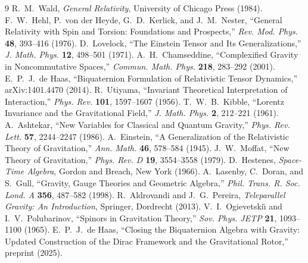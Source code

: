 \documentclass[12pt,a4paper]{article}
\theoremstyle{remark}\newtheorem{remark}[definition]{Remark}
\begin{document}
\begin{thebibliography}{9}
 R.~M.~Wald, \emph{General Relativity}, University of Chicago Press (1984).
 F.~W.~Hehl, P.~von der Heyde, G.~D.~Kerlick, and J.~M.~Nester,
``General Relativity with Spin and Torsion: Foundations and Prospects,''
\emph{Rev. Mod. Phys.} \textbf{48}, 393--416 (1976).
 D.~Lovelock, ``The Einstein Tensor and Its Generalizations,''
\emph{J. Math. Phys.} \textbf{12}, 498--501 (1971).
 A.~H.~Chamseddine, ``Complexified Gravity in
Noncommutative Spaces,'' \emph{Commun. Math. Phys.} \textbf{218}, 283--292 (2001).
 E.~P.~J.~de Haas, ``Biquaternion Formulation of
Relativistic Tensor Dynamics,'' arXiv:1401.4470 (2014).
 R.~Utiyama, ``Invariant Theoretical Interpretation of
Interaction,'' \emph{Phys. Rev.} \textbf{101}, 1597--1607 (1956).
 T.~W.~B.~Kibble, ``Lorentz Invariance and the
Gravitational Field,'' \emph{J. Math. Phys.} \textbf{2}, 212--221 (1961).
 A.~Ashtekar, ``New Variables for Classical and
Quantum Gravity,'' \emph{Phys. Rev. Lett.} \textbf{57}, 2244--2247 (1986).
 A.~Einstein, ``A Generalization of the Relativistic
Theory of Gravitation,'' \emph{Ann. Math.} \textbf{46}, 578--584 (1945).
 J.~W.~Moffat, ``New Theory of Gravitation,''
\emph{Phys. Rev. D} \textbf{19}, 3554--3558 (1979).
 D.~Hestenes, \emph{Space-Time Algebra}, Gordon and
Breach, New York (1966).
 A.~Lasenby, C.~Doran, and S.~Gull, ``Gravity, Gauge
Theories and Geometric Algebra,'' \emph{Phil. Trans. R. Soc. Lond. A}
\textbf{356}, 487--582 (1998).
 R.~Aldrovandi and J.~G.~Pereira,
\emph{Teleparallel Gravity: An Introduction}, Springer, Dordrecht (2013).
 V.~I.~Ogievetski\u{\i} and I.~V.~Polubarinov,
``Spinors in Gravitation Theory,'' \emph{Sov. Phys. JETP} \textbf{21},
1093--1100 (1965).
 E.~P.~J.~de Haas, ``Closing the Biquaternion Algebra
with Gravity: Updated Construction of the Dirac Framework and the
Gravitational Rotor,'' preprint (2025).
\end{thebibliography}
\end{document}
